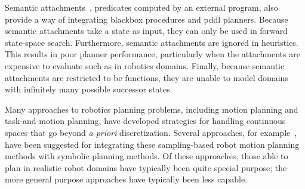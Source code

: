 \documentclass[letterpaper]{article} %
\theoremstyle{plain}\newtheorem{thm}{Theorem}
\theoremstyle{definition}\newtheorem{defn}{Definition}
\theoremstyle{plain}\newtheorem{lem}{Lemma}
\theoremstyle{plain}\newtheorem{cor}{Corollary}
\begin{document}
Semantic attachments~\cite{dornhege09icaps}, predicates computed
by an external program, also provide a way of integrating blackbox
procedures and {\sc pddl} planners. 
Because semantic attachments take 
a state as input, they can only be used in forward state-space search.
Furthermore, semantic attachments are ignored in heuristics. This results in poor planner performance, particularly when the attachments are expensive to evaluate such as in robotics domains. 
Finally, because semantic attachments are restricted to be functions, they are unable to model domains
with infinitely many possible successor states.

Many approaches to robotics planning problems, including motion
planning and task-and-motion planning, have developed strategies for
handling continuous spaces that go beyond {\em a priori}
discretization. %
Several approaches, for example~\cite{HPN,Erdem,Srivastava14,GarrettIROS15,dantam2016tmp,garrett2016ffrob}, have been suggested for
integrating these sampling-based robot motion planning methods with
symbolic planning methods.  Of these approaches, those able to plan in
realistic robot domains have typically been quite special purpose; the
more general purpose approaches have typically been less capable.  

\end{document}
